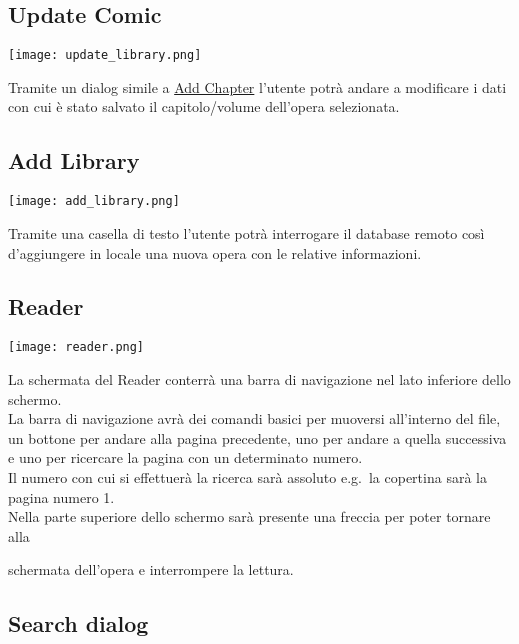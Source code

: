 \documentclass[../Assignment-3-LPSMT.tex]{subfiles}
\begin{document}
\subsection{Update Comic}\label{sec:update_comic}

\begin{center}
  \texttt{[image: update\_library.png]}
\end{center}

Tramite un dialog simile a \hyperref[sec:add_chapter]{Add Chapter} l'utente potrà andare a modificare i dati con cui è stato salvato il capitolo/volume dell'opera selezionata.

\subsection{Add Library}\label{sec:add_library}

\begin{center}
  \texttt{[image: add\_library.png]}
\end{center}

Tramite una casella di testo l'utente potrà interrogare il database remoto così d'aggiungere in locale una nuova opera con le relative informazioni.

\subsection{Reader}\label{sec:reader}

\begin{center}
   \texttt{[image: reader.png]}
\end{center}

La schermata del Reader conterrà una barra di navigazione nel lato inferiore dello schermo.\\
La barra di navigazione avrà dei comandi basici per muoversi all'interno del file, un bottone per andare alla pagina precedente, uno per andare a quella successiva e uno per ricercare la pagina con un determinato numero.\\
Il numero con cui si effettuerà la ricerca sarà assoluto e.g.\ la copertina sarà la pagina numero 1.\\
Nella parte superiore dello schermo sarà presente una freccia per poter tornare alla  schermata dell'opera e interrompere la lettura.

\subsection{Search dialog}
\end{document}
